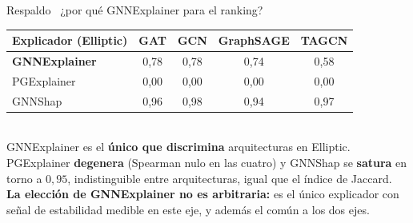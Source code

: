 \documentclass[aspectratio=169,11pt]{beamer}
\begin{document}
\begin{frame}{Respaldo \textperiodcentered\ ¿por qué GNNExplainer para el ranking?}
\begin{center}
\small
\renewcommand{\arraystretch}{1.3}
\begin{tabular}{lcccc}
\toprule
\textbf{Explicador (Elliptic)} & \textbf{GAT} & \textbf{GCN} & \textbf{GraphSAGE} & \textbf{TAGCN} \\
\midrule
\textbf{\color{teal}GNNExplainer} & 0,78 & 0,78 & 0,74 & 0,58 \\
PGExplainer & 0,00 & 0,00 & 0,00 & 0,00 \\
GNNShap & 0,96 & 0,98 & 0,94 & 0,97 \\
\bottomrule
\end{tabular}
\\[10pt]
\footnotesize
GNNExplainer es el \textbf{único que discrimina} arquitecturas en Elliptic. PGExplainer \textbf{degenera} (Spearman nulo en las cuatro) y GNNShap se \textbf{satura} en torno a $0{,}95$, indistinguible entre arquitecturas, igual que el índice de Jaccard.\\[4pt]
\textbf{\color{teal}La elección de GNNExplainer no es arbitraria:} es el único explicador con señal de estabilidad medible en este eje, y además el común a los dos ejes.
\end{center}
\end{frame}
\end{document}
